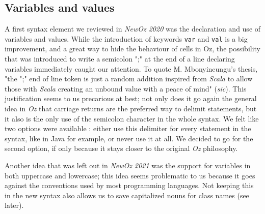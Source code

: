 \subsection{Variables and values}
A first syntax element we reviewed in \textit{NewOz 2020} was the declaration and use of variables and values.
While the introduction of keywords \texttt{var} and \texttt{val} is a big improvement, and a great way to hide the behaviour of cells in Oz, the possibility that was introduced to write a semicolon ";" at the end of a line declaring variables immediately caught our attention.
To quote M. Mbonyincungu's thesis, "the ";" end of line token is just a random addition inspired from \textit{Scala} to allow those with \textit{Scala} creating an unbound value with a peace of mind" (\textit{sic}).
This justification seems to us precarious at best;
not only does it go again the general idea in \textit{Oz} that carriage returns are the preferred way to delimit statements, but it also is the only use of the semicolon character in the whole syntax.
We felt like two options were available : either use this delimiter for every statement in the syntax, like in Java for example, or never use it at all.
We decided to go for the second option, if only because it stays closer to the original \textit{Oz} philosophy.\newline

Another idea that was left out in \textit{NewOz 2021} was the support for variables in both uppercase and lowercase;
this idea seems problematic to us because it goes against the conventions used by most programming languages.
Not keeping this in the new syntax also allows us to save capitalized nouns for class names (see later).\newline


